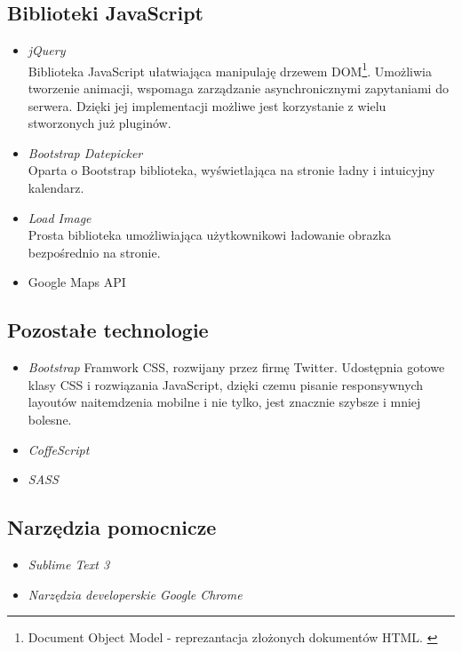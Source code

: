   \subsection{Biblioteki JavaScript}
    \begin{itemize}
      \item \emph{jQuery} \\ Biblioteka JavaScript ułatwiająca manipulaję drzewem DOM\footnote{Document Object Model - reprezantacja złożonych dokumentów HTML. \cite{html5_css3}}. Umożliwia tworzenie animacji, wspomaga zarządzanie asynchronicznymi zapytaniami do serwera. Dzięki jej implementacji możliwe jest korzystanie z wielu stworzonych już pluginów.
      \item \emph{Bootstrap Datepicker} \\ Oparta o Bootstrap biblioteka, wyświetlająca na stronie ładny i intuicyjny kalendarz.
      \item \emph{Load Image} \\ Prosta biblioteka umożliwiająca użytkownikowi ładowanie obrazka bezpośrednio na stronie.
      \item Google Maps API
    \end{itemize}
  \subsection{Pozostałe technologie}
    \begin{itemize}
      \item \emph{Bootstrap}
        Framwork CSS, rozwijany przez firmę Twitter. Udostępnia gotowe klasy CSS i rozwiązania JavaScript, dzięki czemu pisanie responsywnych layoutów naitemdzenia mobilne i nie tylko, jest znacznie szybsze i mniej bolesne.
      \item \emph{CoffeScript}
      \item \emph{SASS}
    \end{itemize}
  \subsection{Narzędzia pomocnicze}
    \begin{itemize}
      \item \emph{Sublime Text 3}
      \item \emph{Narzędzia developerskie Google Chrome}
    \end{itemize}
